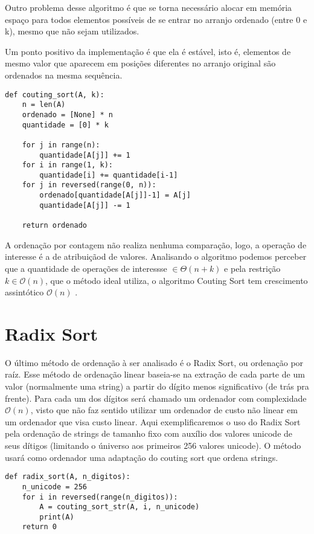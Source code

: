 \documentclass[a4paper, twocolumn]{article}
\theoremstyle{definition}
\begin{document}
Outro problema desse algoritmo é que se torna necessário alocar em memória espaço para todos elementos possíveis de se entrar no arranjo ordenado (entre 0 e k), mesmo que não sejam utilizados.

Um ponto positivo da implementação é que ela é estável, isto é, elementos de mesmo valor que aparecem em posições diferentes no arranjo original são ordenados na mesma sequência.

\begin{lstlisting}[label=couting_sort,caption= Couting Sort]
def couting_sort(A, k):
    n = len(A)
    ordenado = [None] * n
    quantidade = [0] * k

    for j in range(n): 
        quantidade[A[j]] += 1
    for i in range(1, k): 
        quantidade[i] += quantidade[i-1]
    for j in reversed(range(0, n)):
        ordenado[quantidade[A[j]]-1] = A[j]
        quantidade[A[j]] -= 1

    return ordenado
\end{lstlisting}

A ordenação por contagem não realiza nenhuma comparação, logo, a operação de interesse é a de atribuiçãod de valores. Analisando o algoritmo podemos perceber que a quantidade de operações de interessse $\in \Theta(n+k)$ e pela restrição $k \in \mathcal{O}(n)$, que o método ideal utiliza, o algoritmo Couting Sort tem crescimento assintótico $\mathcal{O}(n)$ .

\section{Radix Sort}

O último método de ordenação à ser analisado é o Radix Sort, ou ordenação por raíz. Esse método de ordenação linear baseia-se na extração de cada parte de um valor (normalmente uma string) a partir do dígito menos significativo (de trás pra frente). Para cada um dos dígitos será chamado um ordenador com complexidade $\mathcal{O}(n)$, visto que não faz sentido utilizar um ordenador de custo não linear em um ordenador que visa custo linear. Aqui exemplificaremos o uso do Radix Sort pela ordenação de strings de tamanho fixo com auxílio dos valores unicode de seus dítigos (limitando o úniverso aos primeiros 256 valores unicode). O método usará como ordenador uma adaptação do couting sort que ordena strings.

\begin{lstlisting}[label=radix_sort,caption= Radix Sort para strings de tamanho fixo]
def radix_sort(A, n_digitos):
    n_unicode = 256
    for i in reversed(range(n_digitos)):
        A = couting_sort_str(A, i, n_unicode)
        print(A)
    return 0
\end{lstlisting}
\end{document}

